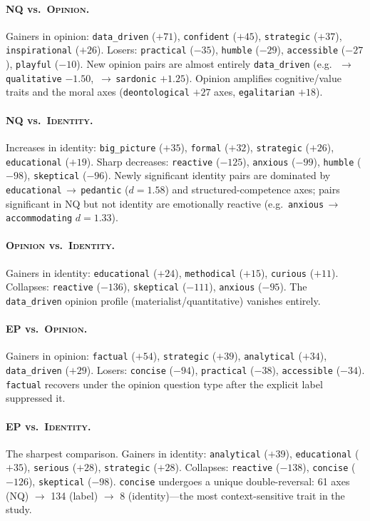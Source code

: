 \documentclass{article}
\newcommand{\ax}[1]{\texttt{#1}}   %
\newcommand{\too}{$\rightarrow$}
\begin{document}
\paragraph{\textsc{NQ} vs.\ \textsc{Opinion}.}
Gainers in opinion: \ax{data\_driven} ($+71$), \ax{confident} ($+45$), \ax{strategic} ($+37$), \ax{inspirational} ($+26$). Losers: \ax{practical} ($-35$), \ax{humble} ($-29$), \ax{accessible} ($-27$), \ax{playful} ($-10$). New opinion pairs are almost entirely \ax{data\_driven} (e.g.\ \,\too\,\ax{qualitative} $-1.50$, \,\too\,\ax{sardonic} $+1.25$). Opinion amplifies cognitive/value traits and the moral axes (\ax{deontological} $+27$ axes, \ax{egalitarian} $+18$).

\paragraph{\textsc{NQ} vs.\ \textsc{Identity}.}
Increases in identity: \ax{big\_picture} ($+35$), \ax{formal} ($+32$), \ax{strategic} ($+26$), \ax{educational} ($+19$). Sharp decreases: \ax{reactive} ($-125$), \ax{anxious} ($-99$), \ax{humble} ($-98$), \ax{skeptical} ($-96$). Newly significant identity pairs are dominated by \ax{educational}\,\too\,\ax{pedantic} ($d=1.58$) and structured-competence axes; pairs significant in \textsc{NQ} but not identity are emotionally reactive (e.g.\ \ax{anxious}\,\too\,\ax{accommodating} $d=1.33$).

\paragraph{\textsc{Opinion} vs.\ \textsc{Identity}.}
Gainers in identity: \ax{educational} ($+24$), \ax{methodical} ($+15$), \ax{curious} ($+11$). Collapses: \ax{reactive} ($-136$), \ax{skeptical} ($-111$), \ax{anxious} ($-95$). The \ax{data\_driven} opinion profile (materialist/quantitative) vanishes entirely.

\paragraph{\textsc{EP} vs.\ \textsc{Opinion}.}
Gainers in opinion: \ax{factual} ($+54$), \ax{strategic} ($+39$), \ax{analytical} ($+34$), \ax{data\_driven} ($+29$). Losers: \ax{concise} ($-94$), \ax{practical} ($-38$), \ax{accessible} ($-34$). \ax{factual} recovers under the opinion question type after the explicit label suppressed it.

\paragraph{\textsc{EP} vs.\ \textsc{Identity}.}
The sharpest comparison. Gainers in identity: \ax{analytical} ($+39$), \ax{educational} ($+35$), \ax{serious} ($+28$), \ax{strategic} ($+28$). Collapses: \ax{reactive} ($-138$), \ax{concise} ($-126$), \ax{skeptical} ($-98$). \ax{concise} undergoes a unique double-reversal: 61 axes (\textsc{NQ}) $\to$ 134 (label) $\to$ 8 (identity)---the most context-sensitive trait in the study.
\end{document}

